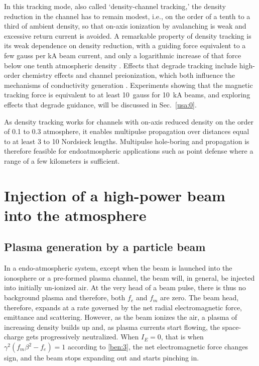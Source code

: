 \documentclass [12pt,a4paper,     ]{report} %
\begin{document}
   In this tracking mode, also called `density-channel tracking,' the density reduction in the channel has to remain modest, i.e., on the order of a tenth to a third of ambient density, so that on-axis ionization by avalanching is weak and excessive return current is avoided.  A remarkable property of density tracking is its weak dependence on density reduction, with a guiding force equivalent to a few gauss per kA beam current, and only a logarithmic increase of that force below one tenth atmospheric density \cite[Fig.2]{FERNS1991A}.  Effects that degrade tracking include high-order chemistry effects and channel preionization, which both influence the mechanisms of conductivity generation \cite{FERNS1991A, MURPH1992-}.  Experiments showing that the magnetic tracking force is equivalent to at least 10~gauss for 10~kA beams, and exploring effects that degrade guidance, will be discussed in Sec.~\ref{usa:0}.

   As density tracking works for channels with on-axis reduced density on the order of 0.1 to 0.3 atmosphere, it enables multipulse propagation over distances equal to at least 3 to 10 Nordsieck lengths.  Multipulse hole-boring and propagation is therefore feasible for endoatmospheric applications such as point defense where a range of a few kilometers is sufficient.




\chapter{Injection of a high-power beam into the atmosphere}

\section{Plasma generation by a particle beam}
\label{pla:0}


In a endo-atmospheric system, except when the beam is launched into the ionosphere or a pre-formed plasma channel, the beam will, in general, be injected into initially un-ionized air.  At the very head of a beam pulse, there is thus no background plasma and therefore, both $f_e$ and $f_m$ are zero.  The beam head, therefore, expands at a rate governed by the net radial electromagnetic force, emittance and scattering.  However, as the beam ionizes the air, a plasma of increasing density builds up and, as plasma currents start flowing, the space-charge gets progressively neutralized.  When $I_E=0$, that is when $\gamma^2(f_m \beta^2 - f_e) = 1$ according to \eqref{ben:3},  the net electromagnetic force changes sign, and the beam stops expanding out and starts pinching in.
\end{document}
